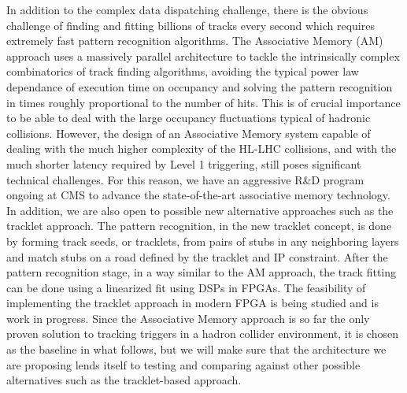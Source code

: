 	In addition to the complex data dispatching challenge, there is the obvious challenge of finding and fitting billions of tracks every second which requires extremely fast pattern recognition algorithms. The Associative Memory (AM) approach uses a massively parallel architecture to tackle the intrinsically complex combinatorics of track finding algorithms, avoiding the typical power law dependance of execution time on occupancy and solving the pattern recognition in times roughly proportional to the number of hits. This is of crucial importance to be able to deal with the large occupancy fluctuations typical of hadronic collisions. However, the design of an Associative Memory system capable of dealing with the much higher complexity of the HL-LHC collisions, and with the much shorter latency required by Level 1 triggering, still poses significant technical challenges. For this reason, we have an aggressive R\&D program ongoing at CMS to advance the state-of-the-art associative memory technology. In addition, we are also open to possible new alternative approaches such as the tracklet approach. The pattern recognition, in the new tracklet concept, is done by forming track seeds, or tracklets, from pairs of stubs in any neighboring layers and match stubs on a road defined by the tracklet and IP constraint. After the pattern recognition stage, in a way similar to the AM approach, the track fitting can be done using a linearized fit using DSPs in FPGAs. The feasibility of implementing the tracklet approach in modern FPGA is being studied and is work in progress. Since the Associative Memory approach is so far the only proven solution to tracking triggers in a hadron collider environment, it is chosen  as the baseline in what follows, but we will make sure that the architecture we are proposing lends itself to testing and comparing against other possible alternatives such as the tracklet-based approach.

